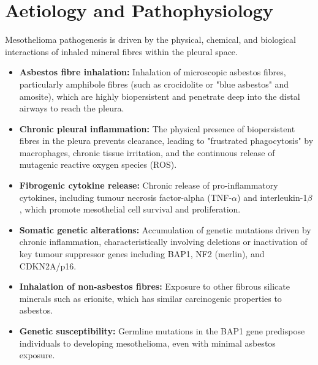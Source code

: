 \section*{Aetiology and Pathophysiology}
Mesothelioma pathogenesis is driven by the physical, chemical, and biological interactions of inhaled mineral fibres within the pleural space.
\begin{itemize}
    \item \textbf{Asbestos fibre inhalation:} Inhalation of microscopic asbestos fibres, particularly amphibole fibres (such as crocidolite or "blue asbestos" and amosite), which are highly biopersistent and penetrate deep into the distal airways to reach the pleura.
    \item \textbf{Chronic pleural inflammation:} The physical presence of biopersistent fibres in the pleura prevents clearance, leading to "frustrated phagocytosis" by macrophages, chronic tissue irritation, and the continuous release of mutagenic reactive oxygen species (ROS).
    \item \textbf{Fibrogenic cytokine release:} Chronic release of pro-inflammatory cytokines, including tumour necrosis factor-alpha (TNF-$\alpha$) and interleukin-1$\beta$, which promote mesothelial cell survival and proliferation.
    \item \textbf{Somatic genetic alterations:} Accumulation of genetic mutations driven by chronic inflammation, characteristically involving deletions or inactivation of key tumour suppressor genes including BAP1, NF2 (merlin), and CDKN2A/p16.
    \item \textbf{Inhalation of non-asbestos fibres:} Exposure to other fibrous silicate minerals such as erionite, which has similar carcinogenic properties to asbestos.
    \item \textbf{Genetic susceptibility:} Germline mutations in the BAP1 gene predispose individuals to developing mesothelioma, even with minimal asbestos exposure.
\end{itemize}

